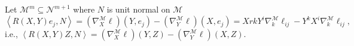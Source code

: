\begin{remark}
	Let \(\mathcal{M} ^m \subseteq \mathcal{N} ^{m+1}\) where \(N\) is unit normal on \(\mathcal{M} \)
	\[
		\left\langle R(X, Y) e_j , N \right\rangle = (\nabla _X ^{\mathcal{M} } \ell ) (Y, e_j) - (\nabla _Y ^{\mathcal{M} } \ell )(X, e_j)
		= Xrk Y^i \nabla _k^{\mathcal{M} } \ell _{ij} - Y^k X^i \nabla _k^{\mathcal{M} } \ell _{ij},
	\]
	i.e., \(\left\langle R(X, Y) Z, N \right\rangle = (\nabla _X^{\mathcal{M} } \ell )(Y, Z) - (\nabla _Y^{\mathcal{M} } \ell )(X, Z)\).
\end{remark}